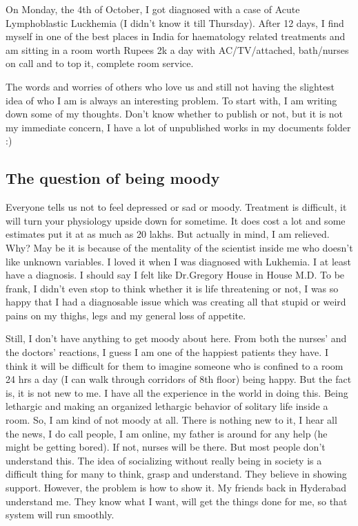 \vskip 2pt

On Monday, the 4th of October, I got diagnosed with a case of Acute Lymphoblastic Luckhemia 
(I didn't know it till Thursday). After 12 days, I find myself in one of the best places in
 India for haematology related treatments and am sitting in a room worth Rupees 2k a day
 with AC/TV/attached, bath/nurses on call and to top it, complete room service.

The words and worries of others who love us and still not having the slightest idea of
 who I am is always an interesting problem. To start with, I am writing down some of
 my thoughts. Don't know whether to publish or not, but it is not my immediate concern,
 I have a lot of unpublished works in my documents folder :)

\subsection*{The question of being moody} 

Everyone tells us not to feel depressed or sad or moody. Treatment is difficult, it 
will turn your physiology upside down for sometime. It does cost a lot and some 
estimates put it at as much as 20 lakhs. But actually in mind, I am relieved. Why? May 
be it is because of the mentality of the scientist inside me who doesn't like unknown variables. I loved
 it when I was diagnosed with Lukhemia. I at least have a diagnosis. I should say I 
felt like Dr.Gregory House in House M.D. To be frank, I didn't even stop to think whether
 it is life threatening or not, I was so happy that I had a diagnosable issue which was 
creating all that stupid or weird pains on my thighs, legs and my general loss of appetite.

Still, I don't have anything to get moody about here. From both the nurses' and the doctors' reactions, I guess
I am one of the happiest patients they have. I think it will be difficult for them to 
imagine someone who is confined to a room 24 hrs a day (I can walk through corridors of
 8th floor) being happy. But the fact is, it is not new to me. I have all the experience in 
the world in doing this. Being lethargic and making an organized lethargic behavior of
solitary life inside a room. So, I am kind of not moody at all. There is nothing new to it,
I hear all the news, I do call people, I am online, my father is around for any help (he might
be getting bored). If not, nurses will be there. But most people don't understand this. The
idea of socializing without really being in society is a difficult thing for many to think, 
grasp and understand. They believe in showing support. However, the problem is how to show it. My 
friends back in Hyderabad understand me. They know what I want, will get the things done for
me, so that system will run smoothly. 

